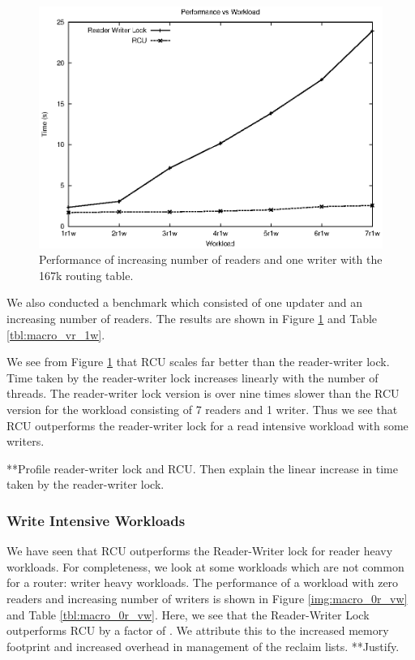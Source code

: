 \documentclass{article}
\begin{document}
\begin{figure}[tph]
\includegraphics[scale = 0.6]{../images/graphs/macro_vr_1w}
\caption{Performance of increasing number of readers and one writer with the 167k routing table.}
\label{img:macro_vr_1w}
\end{figure}

We also conducted a benchmark which consisted of one updater and an
increasing number of readers. The results are shown in Figure
\ref{img:macro_vr_1w} and Table \ref{tbl:macro_vr_1w}.

We see from Figure \ref{img:macro_vr_1w} that RCU scales far better
than the reader-writer lock. Time taken by the reader-writer lock
increases linearly with the number of threads. The reader-writer lock
version is over nine times slower than the RCU version for the
workload consisting of 7 readers and 1 writer. Thus we see that RCU
outperforms the reader-writer lock for a read intensive workload with
some writers.

**Profile reader-writer lock and RCU. Then explain the linear increase
in time taken by the reader-writer lock.

\subsubsection{Write Intensive Workloads}
We have seen that RCU outperforms the Reader-Writer lock for reader heavy workloads. For completeness, we look at some workloads which are not common for a router: writer heavy workloads. The performance of a workload with zero readers and increasing number of writers is shown in  Figure \ref{img:macro_0r_vw} and Table \ref{tbl:macro_0r_vw}. Here, we see that the Reader-Writer Lock outperforms RCU by a factor of . We attribute this to the increased memory footprint and increased overhead in management of the reclaim lists. **Justify.
\end{document}
